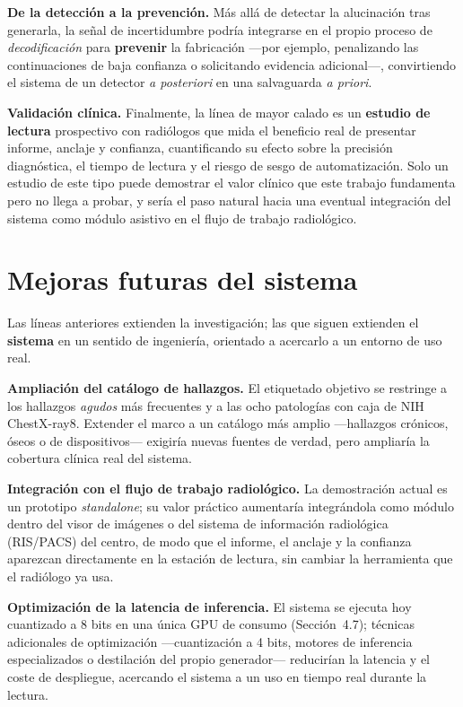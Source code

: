 \textbf{De la detección a la prevención.} Más allá de detectar la alucinación tras generarla, la señal
de incertidumbre podría integrarse en el propio proceso de \emph{decodificación} para \textbf{prevenir}
la fabricación —por ejemplo, penalizando las continuaciones de baja confianza o solicitando evidencia
adicional—, convirtiendo el sistema de un detector \emph{a posteriori} en una salvaguarda \emph{a
priori}.

\textbf{Validación clínica.} Finalmente, la línea de mayor calado es un \textbf{estudio de lectura}
prospectivo con radiólogos que mida el beneficio real de presentar informe, anclaje y confianza,
cuantificando su efecto sobre la precisión diagnóstica, el tiempo de lectura y el riesgo de sesgo de
automatización. Solo un estudio de este tipo puede demostrar el valor clínico que este trabajo
fundamenta pero no llega a probar, y sería el paso natural hacia una eventual integración del sistema
como módulo asistivo en el flujo de trabajo radiológico.

\clearpage
\section{Mejoras futuras del sistema}
Las líneas anteriores extienden la investigación; las que siguen extienden el \textbf{sistema} en un
sentido de ingeniería, orientado a acercarlo a un entorno de uso real.

\textbf{Ampliación del catálogo de hallazgos.} El etiquetado objetivo se restringe a los hallazgos
\emph{agudos} más frecuentes y a las ocho patologías con caja de NIH ChestX-ray8. Extender el marco a
un catálogo más amplio —hallazgos crónicos, óseos o de dispositivos— exigiría nuevas fuentes de verdad,
pero ampliaría la cobertura clínica real del sistema.

\textbf{Integración con el flujo de trabajo radiológico.} La demostración actual es un prototipo
\textit{standalone}; su valor práctico aumentaría integrándola como módulo dentro del visor de
imágenes o del sistema de información radiológica (RIS/PACS) del centro, de modo que el informe, el
anclaje y la confianza aparezcan directamente en la estación de lectura, sin cambiar la herramienta que
el radiólogo ya usa.

\textbf{Optimización de la latencia de inferencia.} El sistema se ejecuta hoy cuantizado a 8 bits en
una única GPU de consumo (Sección~4.7); técnicas adicionales de optimización —cuantización a 4 bits,
motores de inferencia especializados o destilación del propio generador— reducirían la latencia y el
coste de despliegue, acercando el sistema a un uso en tiempo real durante la lectura.

